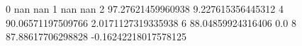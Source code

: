 0 nan nan
1 nan nan
2 97.27621459960938 9.227615356445312
4 90.06571197509766 2.0171127319335938
6 88.04859924316406 0.0
8 87.88617706298828 -0.16242218017578125
